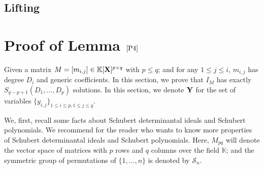 \documentclass[11pt]{article}
\numberwithin{Property}{section}
\numberwithin{Theorem}{section}
\numberwithin{Proposition}{section}
\numberwithin{Lemma}{section}
\numberwithin{Corollary}{section}
\numberwithin{Definition}{section}
\numberwithin{Remark}{section}
\numberwithin{Conjecture}{section}
\numberwithin{Problem}{section}
\numberwithin{Example}{section}
\numberwithin{Claim}{section}
\renewcommand{\leq}{\leqslant}
\newcommand{\field}{\mathbb{K}} %
\newcommand{\mat}[1]{\mathbf{\MakeUppercase{#1}}} %
\begin{document}
\subsection{Lifting}
\newpage


\appendix
\section{Proof of Lemma $\ref{P4}$}
\label{sec:proof}
Given a matrix $M = [m_{i,j}] \in \field[\mat{X}]^{p \times q}$ with $p \leq q$; and for any $1 \leq j \leq i$, $m_{i,j}$ has degree $D_i$ and generic coefficients. In this section, we prove that $I_M$ has exactly $S_{q-p+1}(D_1, \ldots, D_p)$ solutions. In this section, we denote $\mat{Y}$ for the set of variables $\{y_{i,j}\}_{1 \leq i \leq p, 1 \leq j \leq q}$.

We, first, recall some facts about Schubert determinantal ideals and Schubert polynomials. We recommend \cite[Chapter~ 15]{Miller04} for the reader who wants to know more properties of Schubert determinantal ideals and Schubert polynomials. Here, $M_{pq}$ will denote the vector space of matrices with $p$ rows and $q$ columns over the field $\field$; and the symmetric group of permutations of $\{1, \ldots, n\}$ is denoted by $\mathcal{S}_n$. 
\end{document}
